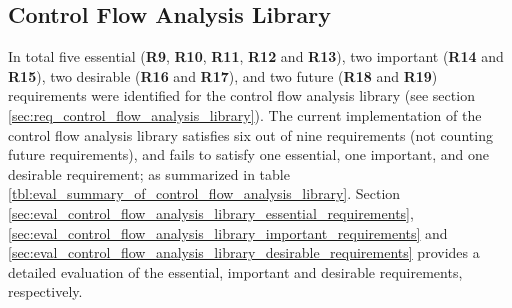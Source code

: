 
\subsection{Control Flow Analysis Library}
\label{sec:eval_control_flow_analysis_library}

In total five essential (\textbf{R9}, \textbf{R10}, \textbf{R11}, \textbf{R12} and \textbf{R13}), two important (\textbf{R14} and \textbf{R15}), two desirable (\textbf{R16} and \textbf{R17}), and two future (\textbf{R18} and \textbf{R19}) requirements were identified for the control flow analysis library (see section \ref{sec:req_control_flow_analysis_library}). The current implementation of the control flow analysis library satisfies six out of nine requirements (not counting future requirements), and fails to satisfy one essential, one important, and one desirable requirement; as summarized in table \ref{tbl:eval_summary_of_control_flow_analysis_library}. Section \ref{sec:eval_control_flow_analysis_library_essential_requirements}, \ref{sec:eval_control_flow_analysis_library_important_requirements} and \ref{sec:eval_control_flow_analysis_library_desirable_requirements} provides a detailed evaluation of the essential, important and desirable requirements, respectively.

